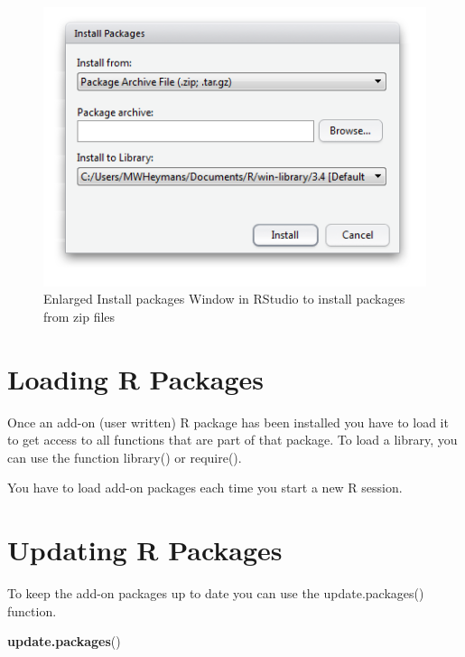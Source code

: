 \documentclass[
]{book}
\newenvironment{Shaded}{\begin{snugshade}}{\end{snugshade}}
\newcommand{\KeywordTok}[1]{\textcolor[rgb]{0.13,0.29,0.53}{\textbf{#1}}}
\newcommand{\NormalTok}[1]{#1}
\begin{document}
\begin{figure}

{\centering \includegraphics[width=0.95\linewidth]{images/fig1.26b} 

}

\caption{Enlarged Install packages Window in RStudio to install packages from zip files}\label{fig:fig28}
\end{figure}

\hypertarget{loading-r-packages}{%
\section{Loading R Packages}\label{loading-r-packages}}

Once an add-on (user written) R package has been installed you have to load it to get access to all functions that are part of that package. To load a library, you can use the function library() or require().

You have to load add-on packages each time you start a new R session.

\hypertarget{updating-r-packages}{%
\section{Updating R Packages}\label{updating-r-packages}}

To keep the add-on packages up to date you can use the update.packages() function.

\begin{Shaded}
\begin{Highlighting}[]
\KeywordTok{update.packages}\NormalTok{()}
\end{Highlighting}
\end{Shaded}
\end{document}
